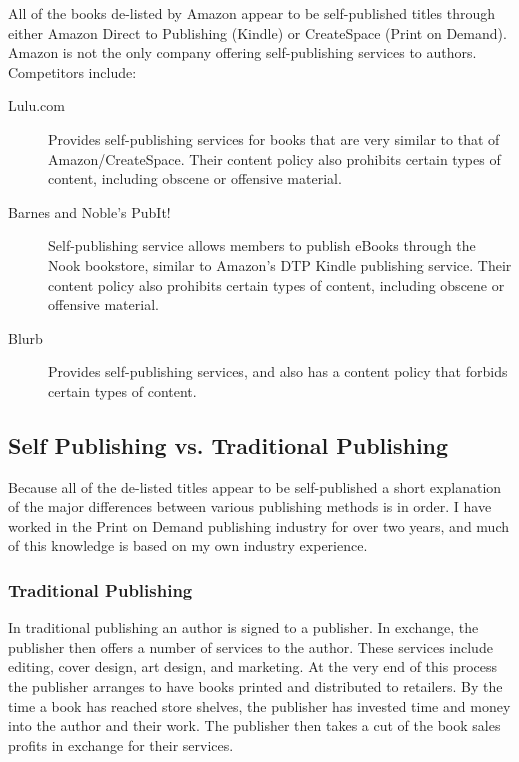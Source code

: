 \documentclass[11pt]{article}
\begin{document}
\begin{multicols}{2}
All of the books de-listed by Amazon appear to be self-published titles through either Amazon Direct to Publishing (Kindle) or CreateSpace (Print on Demand).  Amazon is not the only company offering self-publishing services to authors. Competitors include:
   \begin{description}
   \item[Lulu.com] Provides self-publishing services for books that are very similar to that of Amazon/CreateSpace.  Their content policy also prohibits certain types of content, including obscene or offensive material. \cite{LuluMemberAgreement}

   \item[Barnes and Noble's PubIt!] Self-publishing service allows members to publish eBooks through the Nook bookstore, similar to Amazon's DTP Kindle publishing service.  Their content policy also prohibits certain types of content, including obscene or offensive material.  \cite[Select Service Policies, then Content Policy]{PubItContentPolicy}

   \item[Blurb] Provides self-publishing services, and also has a content policy that forbids certain types of content. \cite{BlurbEULA}
   \end{description}

\subsection{Self Publishing vs. Traditional Publishing}

Because all of the de-listed titles appear to be self-published a short explanation of the major differences between various publishing methods is in order.  I have worked in the Print on Demand publishing industry for over two years, and much of this knowledge is based on my own industry experience.

\subsubsection{Traditional Publishing}

In traditional publishing an author is signed to a publisher.  In exchange, the publisher then offers a number of services to the author.  These services include editing, cover design, art design, and marketing. \cite{WhatPublisherDoes}  At the very end of this process the publisher arranges to have books printed and distributed to retailers. \cite{WhatPublisherDoes}  By the time a book has reached store shelves, the publisher has invested time and money into the author and their work.  The publisher then takes a cut of the book sales profits in exchange for their services.


\end{multicols}
\end{document}
